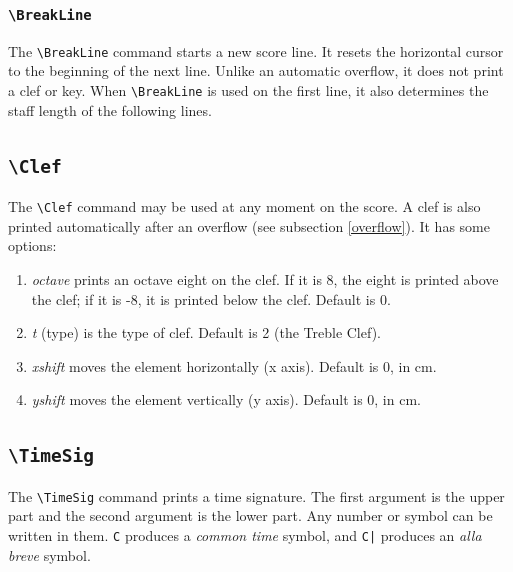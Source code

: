 \documentclass[final]{article}
\begin{document}
	\subsubsection{\texttt{\textbackslash BreakLine}}
	The \verb|\BreakLine| command starts a new score line. It resets the horizontal cursor to the beginning of the next line. Unlike an automatic overflow, it does not print a clef or key. When \verb|\BreakLine| is used on the first line, it also determines the staff length of the following lines.
	
	
	\subsection{\texttt{\textbackslash Clef}}
	The \verb|\Clef| command may be used at any moment on the score. A clef is also printed automatically after an overflow (see subsection \ref{overflow}). It has some options:
	\begin{enumerate}[-]
		\item \textsl{octave} prints an octave eight on the clef. If it is 8, the eight is printed above the clef; if it is -8, it is printed below the clef. Default is 0.
		\item \textsl{t} (type) is the type of clef. Default is 2 (the Treble Clef).
		\item \textsl{xshift} moves the element horizontally (x axis). Default is 0, in cm.
		\item \textsl{yshift} moves the element vertically (y axis). Default is 0, in cm.
	\end{enumerate}
	\begin{center}
		\begin{mousik}
			\Clef[t=1]
			\Clef[t=2]
			\Clef[t=3]
			\Clef[t=4]
			\Clef[t=11]
			\Clef[t=12]
			\Clef[t=13]
			\Clef[t=14]
			\Clef[t=15]
			\Clef[t=0]
			\Barline[t=|.]
		\end{mousik}
	\end{center}

	\subsection{\texttt{\textbackslash TimeSig}}
	The \verb|\TimeSig| command prints a time signature. The first argument is the upper part and the second argument is the lower part. Any number or symbol can be written in them. \texttt{C} produces a \textit{common time} symbol, and \texttt{C|} produces an \textit{alla breve} symbol.
	
\end{document}
